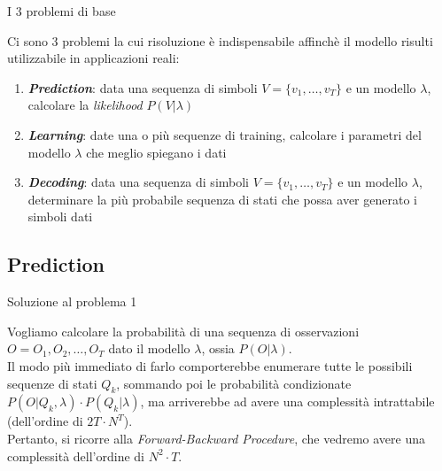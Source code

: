\documentclass[slidestop,mathserif,red]{beamer}
\begin{document}
\begin{frame}{I 3 problemi di base}
 \begin{block}{}
  Ci sono 3 problemi la cui risoluzione \`e indispensabile affinch\`e il modello risulti utilizzabile in applicazioni reali:
	\begin{enumerate}
	 \item \textit{\textbf{Prediction}}: data una sequenza di simboli $V = \{v_{1}, \ldots, v_{T}\}$ e un modello $\lambda$, calcolare la \textit{likelihood} $P(V|\lambda)$
	 \item \textbf{\textit{Learning}}: date una o pi\`u sequenze di training, calcolare i parametri del modello $\lambda$ che meglio spiegano i dati
	 \item \textit{\textbf{Decoding}}: data una sequenza di simboli $V = \{v_{1}, \ldots, v_{T}\}$ e un modello $\lambda$, determinare la pi\`u probabile sequenza di stati che possa aver generato i simboli dati
	\end{enumerate}
 \end{block}
\end{frame}

\subsection{Prediction}

\begin{frame}{Soluzione al problema 1}
 \begin{block}{}
  Vogliamo calcolare la probabilit\`a di una sequenza di osservazioni $O = O_{1}, O_{2}, \ldots, O_{T}$ dato il modello $\lambda$, ossia $P(O|\lambda)$. \\
Il modo pi\`u immediato di farlo comporterebbe enumerare tutte le possibili sequenze di stati $Q_{k}$, sommando poi le probabilit\`a condizionate $P(O|Q_{k},\lambda) \cdot P(Q_{k}|\lambda)$, ma arriverebbe ad avere una complessit\`a intrattabile (dell'ordine di $2T \cdot N^{T}$).\\
Pertanto, si ricorre alla \textit{Forward-Backward Procedure}, che vedremo avere una complessit\`a dell'ordine di $N^2 \cdot T$.
 \end{block}

\end{frame}
\end{document}

